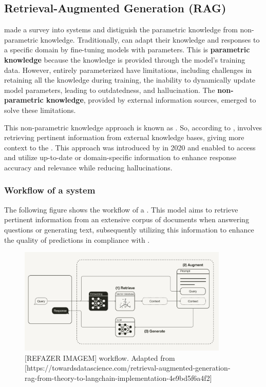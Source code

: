 \subsection{Retrieval-Augmented Generation (RAG)}

\citet{gao_retrieval-augmented_2023} made a survey into {\rag} systems and distiguish the parametric knowledge from non-parametric knowledge. Traditionally, {\llm} can adapt their knowledge and responses to a specific domain by fine-tuning models with parameters. This is \textbf{parametric knowledge} because the {\llm} knowledge is provided through the model's training data. However, entirely parameterized {\llm} have limitations, including challenges in retaining all the knowledge during training, the inability to dynamically update model parameters, leading to outdatedness, and hallucination. The \textbf{non-parametric knowledge}, provided by external information sources, emerged to solve these limitations.

This non-parametric knowledge approach is known as {\rag}. So, according to \citet{gao_retrieval-augmented_2023}, {\rag} involves retrieving pertinent information from external knowledge bases, giving more context to the {\llm}. This approach was introduced by \citet{lewis_retrieval-augmented_2020} in 2020 and enabled {\llm} to access and utilize up-to-date or domain-specific information to enhance response accuracy and relevance while reducing hallucinations.


\subsubsection{Workflow of a {\rag} system}

The following figure shows the workflow of a {\rag}. This model aims to retrieve pertinent information from an extensive corpus of documents when answering questions or generating text, subsequently utilizing this information to enhance the quality of predictions in compliance with \citet{lewis_retrieval-augmented_2020}.

\begin{figure}[ht]
    \includegraphics[width=10cm]{figs/chapter2/rag_workflow.png}
    \centering
    \caption{[REFAZER IMAGEM] {\rag} workflow. Adapted from [https://towardsdatascience.com/retrieval-augmented-generation-rag-from-theory-to-langchain-implementation-4e9bd5f6a4f2]}
\end{figure}

